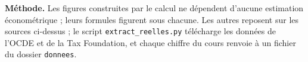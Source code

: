\documentclass[11pt,a4paper]{article}
\begin{document}
{\textbf{Méthode.} Les figures construites par le calcul ne dépendent d'aucune estimation
économétrique ; leurs formules figurent sous chacune. Les autres reposent sur les sources ci-dessus ; le script
\texttt{extract\_reelles.py} télécharge les données de l'OCDE et de la Tax Foundation, et chaque
chiffre du cours renvoie à un fichier du dossier \texttt{donnees}.}
\end{document}
